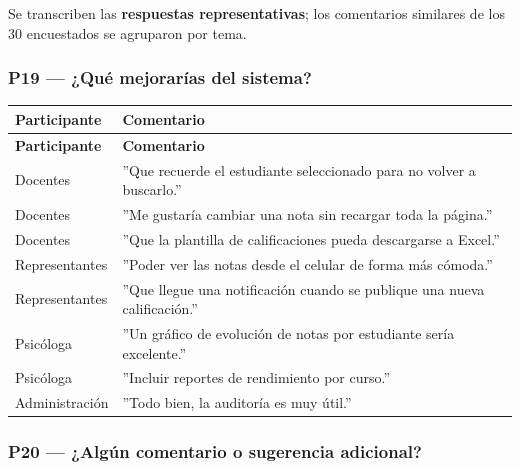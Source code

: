 \documentclass[11pt,a4paper]{article}
\begin{document}
Se transcriben las \textbf{respuestas representativas}; los comentarios similares de los 30 encuestados se agruparon por tema.


\subsubsection*{P19 --- ¿Qué mejorarías del sistema?}


{\small
\begin{longtable}{|p{}|p{}|}
\rowcolor{UTECblue}\color{white}\bfseries Participante & \color{white}\bfseries Comentario \\ \hline
\endfirsthead
\rowcolor{UTECblue}\color{white}\bfseries Participante & \color{white}\bfseries Comentario \\ \hline
\endhead
Docentes & ''Que recuerde el estudiante seleccionado para no volver a buscarlo.'' \\ \hline
Docentes & ''Me gustaría cambiar una nota sin recargar toda la página.'' \\ \hline
Docentes & ''Que la plantilla de calificaciones pueda descargarse a Excel.'' \\ \hline
Representantes & ''Poder ver las notas desde el celular de forma más cómoda.'' \\ \hline
Representantes & ''Que llegue una notificación cuando se publique una nueva calificación.'' \\ \hline
Psicóloga & ''Un gráfico de evolución de notas por estudiante sería excelente.'' \\ \hline
Psicóloga & ''Incluir reportes de rendimiento por curso.'' \\ \hline
Administración & ''Todo bien, la auditoría es muy útil.'' \\ \hline
\end{longtable}}


\subsubsection*{P20 --- ¿Algún comentario o sugerencia adicional?}
\end{document}
